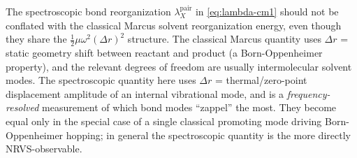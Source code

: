 \documentclass[10pt,a4paper,twoside]{article}
\begin{document}
The spectroscopic bond reorganization $\lambda_X^\text{pair}$ in
\cref{eq:lambda-cm1} should not be conflated with the classical
Marcus solvent reorganization energy, even though they share the
$\tfrac{1}{2}\mu\omega^2(\Delta r)^2$ structure. The classical Marcus
quantity uses $\Delta r$ = static geometry shift between reactant
and product (a Born-Oppenheimer property), and the relevant degrees
of freedom are usually intermolecular solvent modes. The
spectroscopic quantity here uses $\Delta r$ = thermal/zero-point
displacement amplitude of an internal vibrational mode, and is a
\emph{frequency-resolved} measurement of which bond modes
``zappel'' the most. They become equal only in the special case
of a single classical promoting mode driving Born-Oppenheimer
hopping; in general the spectroscopic quantity is the more directly
NRVS-observable.
\end{document}
